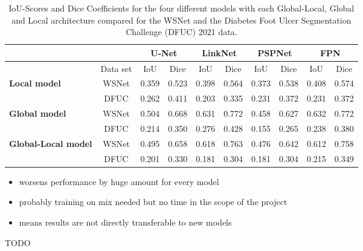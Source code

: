 \begin{table}[htb!]
	\centering
	\begin{tabular}{l | c ||c | c || c | c || c | c || c | c||}
	& & \multicolumn{2}{|c||}{U-Net} & \multicolumn{2}{|c||}{LinkNet} & \multicolumn{2}{|c||}{PSPNet} & \multicolumn{2}{|c||}{FPN} \\
	\hline
	& Data set & IoU & Dice & IoU & Dice & IoU & Dice & IoU & Dice \\
	\hline\hline
	\multirow{2}{*}{\textbf{Local model}} & WSNet & 0.359 & 0.523 & 0.398 & 0.564 & 0.373 & 0.538 & 0.408 & 0.574 \\
	& DFUC & 0.262 & 0.411 & 0.203 & 0.335 & 0.231 & 0.372 & 0.231 & 0.372\\
	\hline
	\multirow{2}{*}{\textbf{Global model}} & WSNet & 0.504 & 0.668 & 0.631 & 0.772 & 0.458 & 0.627 & 0.632 & 0.772 \\
	& DFUC & 0.214 & 0.350 & 0.276 & 0.428 & 0.155 & 0.265 & 0.238 & 0.380\\
	\hline
	\multirow{2}{*}{\textbf{Global-Local model}} & WSNet & 0.495 & 0.658 & 0.618 & 0.763 & 0.476 & 0.642 & 0.612 & 0.758\\
	& DFUC & 0.201 & 0.330 & 0.181 & 0.304 & 0.181 & 0.304 & 0.215 & 0.349\\
	\end{tabular}
	\caption{IoU-Scores and Dice Coefficients for the four different models with each Global-Local, Global and Local architecture compared for the WSNet and the Diabetes Foot Ulcer Segmentation Challenge (DFUC) 2021 data.}
	\label{table:dataset-comparison}
\end{table}

\begin{itemize}
	\item worsens performance by huge amount for every model
	\item probably training on mix needed but no time in the scope of the project
	\item means results are not directly transferable to new models
\end{itemize}

TODO
